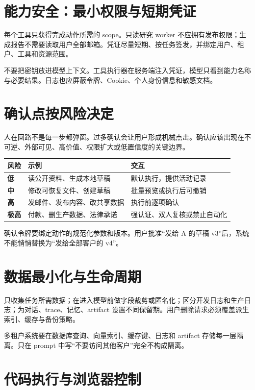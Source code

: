 \section{能力安全：最小权限与短期凭证}

每个工具只获得完成动作所需的 scope。只读研究 worker 不应拥有发布权限；生成报告不需要读取用户全部邮箱。凭证尽量短期、按任务签发，并绑定用户、租户、工具和资源范围。

不要把密钥放进模型上下文。工具执行器在服务端注入凭证，模型只看到能力名称与必要结果。日志也应屏蔽令牌、Cookie、个人身份信息和敏感文档。

\section{确认点按风险决定}

人在回路不是每一步都弹窗。过多确认会让用户形成机械点击。确认应该出现在不可逆、外部可见、高价值、权限扩大或低置信度的关键边界。

\begin{table}[htbp]
\centering
\begin{tabularx}{\textwidth}{>{\bfseries}p{} X X}
\toprule
风险 & 示例 & 交互 \\
\midrule
低 & 读公开资料、生成本地草稿 & 默认执行，提供活动记录 \\
中 & 修改可恢复文件、创建草稿 & 批量预览或执行后可撤销 \\
高 & 发邮件、发布内容、改共享数据 & 执行前逐项确认 \\
极高 & 付款、删生产数据、法律承诺 & 强认证、双人复核或禁止自动化 \\
\bottomrule
\end{tabularx}
\end{table}

确认令牌要绑定动作的规范化参数和版本。用户批准“发给 A 的草稿 v3”后，系统不能悄悄替换为“发给全部客户的 v4”。

\section{数据最小化与生命周期}

只收集任务所需数据；在进入模型前做字段裁剪或匿名化；区分开发日志和生产日志；为对话、trace、记忆、artifact 设置不同保留期。用户删除请求必须覆盖派生索引、缓存与备份策略。

多租户系统要在数据库查询、向量索引、缓存键、日志和 artifact 存储每一层隔离。只在 prompt 中写“不要访问其他客户”完全不构成隔离。

\section{代码执行与浏览器控制}

